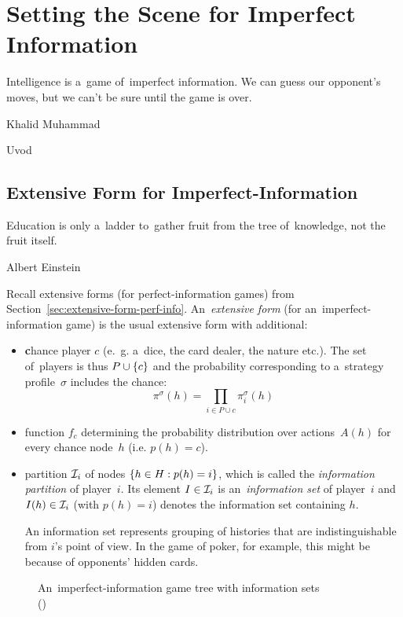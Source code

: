 \chapter{Setting the Scene for Imperfect Information}
\epigraph{
  Intelligence is a~game of~imperfect information.
  We can guess our opponent's moves, but we can't be sure until the game is over.
}{Khalid Muhammad}
\todo Uvod

\section{Extensive Form for Imperfect-Information}
\label{sec:extensive-form-imperf-info}
\epigraph{
  Education is only a~ladder to~gather fruit from the tree of~knowledge, not the fruit itself.
}{Albert Einstein}
Recall extensive forms (for perfect-information games) from Section~\ref{sec:extensive-form-perf-info}.
An~\emph{extensive form} (for an~imperfect-information game) is the usual extensive form with additional:
\begin{itemize}
  \item \textbf{c}hance player $c$ (e.~g. a~dice, the card dealer, the nature etc.).
    The set of~players is thus $P \cup \left\{ c \right\}$ and the probability corresponding to a~strategy profile~$\sigma$ includes the chance:
    \[\pi ^\sigma(h) = \prod _{i \in P \cup {c}} \pi _i ^\sigma (h)\]

  \item function $f_c$ determining the probability distribution over actions~$A(h)$ for every chance node~$h$ (i.e. $p(h) = c$).

  \item partition $\mathcal{I}_i$ of nodes $\left\{ h \in H: p(h) = i \right\}$, which is called the \emph{information partition} of player~$i$.
    Its element $I \in \mathcal{I}_i$ is an~\emph{information set} of player~$i$ and $I(h) \in \mathcal{I}_i$ (with $p(h) = i$) denotes the information set containing $h$.

    An information set represents grouping of histories that are indistinguishable from $i$'s point of view.
    In the game of poker, for example, this might be because of  opponents' hidden cards.
\end{itemize}
\noindent
\begin{figure}[H]
  \centering
  \scriptsize
  \def\svgwidth{.7\textwidth}
  
  \def\captionTitle{An~imperfect-information game tree with information sets}
  \caption[\captionTitle]{\captionTitle{} \\(\cite[p.~67]{AGT07})}
  \label{fig:strategic-form-tree}
\end{figure}
